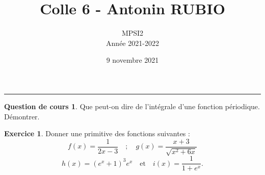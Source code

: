 \documentclass[a4paper, 11pt,openany]{article}%
\title{Colle 6 - Antonin RUBIO}
\author{MPSI2\\
Année 2021-2022}
\date{9 novembre 2021}
\theoremstyle{plain}
\theoremstyle{definition}
\newtheorem{cours}{Question de cours}
\newtheorem{exo}{Exercice}
\newtheorem{sol}{Solution de l'exercice}
\theoremstyle{remark}
\begin{document}
   \maketitle
      \rule{\linewidth}{0.5mm}

\begin{cours}
Que peut-on dire de l'intégrale d'une fonction périodique. Démontrer.
\end{cours}

\begin{exo}
Donner une primitive des fonctions suivantes :
\[ f(x) = \frac{1}{2x-3} \quad ; \quad  g(x) =  \frac{x+3}{\sqrt{x^2 + 6x}}\]
\[ h(x) = (e^x +1)^3 e^x \quad \text{et} \quad i(x) = \frac{1}{1+e^x}.\]
\end{exo}

\end{document}
